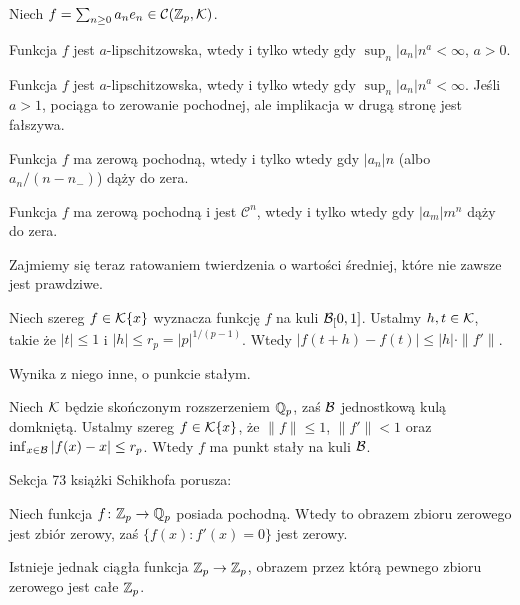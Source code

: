 Niech $f = \sum_{n \ge 0} a_n e_n \in \mathcal C(\mathbb Z_p, \mathcal K)$.

\begin{fakt}
	Funkcja $f$ jest $a$-lipschitzowska, wtedy i tylko wtedy gdy $\sup_n |a_n| n^a < \infty$, $a > 0$.
\end{fakt}

\begin{fakt}
	Funkcja $f$ jest $a$-lipschitzowska, wtedy i tylko wtedy gdy $\sup_n |a_n| n^a < \infty$.
	Jeśli $a > 1$, pociąga to zerowanie pochodnej, ale implikacja w drugą stronę jest fałszywa.
\end{fakt}

\begin{fakt}
	Funkcja $f$ ma zerową pochodną, wtedy i tylko wtedy gdy $|a_n| n$ (albo $a_n / (n-n_-)$) dąży do zera.
\end{fakt}

\begin{fakt}
	Funkcja $f$ ma zerową pochodną i jest $\mathcal C^n$, wtedy i tylko wtedy gdy $|a_m|m^n$ dąży do zera.
\end{fakt}

Zajmiemy się teraz ratowaniem twierdzenia o wartości średniej, które nie zawsze jest prawdziwe.

\begin{fakt}
	Niech szereg $f \in \mathcal K\{x\}$ wyznacza funkcję $f$ na kuli $\mathcal B_[0, 1]$.
	Ustalmy $h, t \in \mathcal K$, takie że $|t| \le 1$ i $|h| \le r_p = |p|^{1 / (p-1)}$.
	Wtedy $|f(t+h) - f(t)| \le |h| \cdot \|f'\|$.
\end{fakt}

Wynika z niego inne, o punkcie stałym.
\begin{fakt}
	Niech $\mathcal K$ będzie skończonym rozszerzeniem $\mathbb Q_p$, zaś $\mathcal B$ jednostkową kulą domkniętą.
	Ustalmy szereg $f \in \mathcal K \{x\}$, że $\|f\| \le 1$, $\|f'\| < 1$ oraz $\inf_{x \in \mathcal B} |f(x) - x| \le r_p$.
	Wtedy $f$ ma punkt stały na kuli $\mathcal B$.
\end{fakt}

Sekcja 73 książki Schikhofa porusza:

\begin{twierdzenie}[Łuzin]
	Niech funkcja $f \colon \mathbb Z_p \to \mathbb Q_p$ posiada pochodną.
	Wtedy to obrazem zbioru zerowego jest zbiór zerowy, zaś $\{f(x) : f'(x) = 0\}$ jest zerowy.
\end{twierdzenie}

Istnieje jednak ciągła funkcja $\mathbb Z_p \to \mathbb Z_p$, obrazem przez którą pewnego zbioru zerowego jest całe $\mathbb Z_p$.


